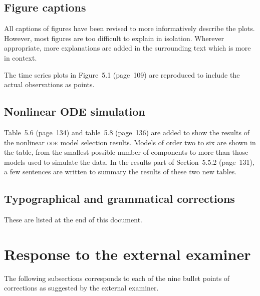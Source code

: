 \documentclass[11pt, fontset=Scala]{marticle}
\begin{document}
\subsection{Figure captions} %
\label{sub:figure_captions_point_2_}

All captions of figures have been revised to more informatively describe the plots. However, most figures are too difficult to explain in isolation. Wherever appropriate, more explanations are added in the surrounding text which is more in context.

The time series plots in Figure~5.1 (page~109) are reproduced to include the actual observations as points.


\subsection{Nonlinear ODE simulation} %
\label{sub:nonlinear_ode_simulation}

Table~5.6 (page~134) and table~5.8 (page~136) are added to show the results of the nonlinear \textsc{ode} model selection results. Models of order two to six are shown in the table, from the smallest possible number of components to more than those models used to simulate the data. In the results part of Section~5.5.2 (page~131), a few sentences are written to summary the results of these two new tables.


\subsection{Typographical and grammatical corrections} %
\label{sub:typographical_and_grammatical_corrections}

These are listed at the end of this document.



\section{Response to the external examiner} %
\label{sec:response_to_the_external_examiner}

The following subsections corresponds to each of the nine bullet points of corrections as suggested by the external examiner.
\end{document}
